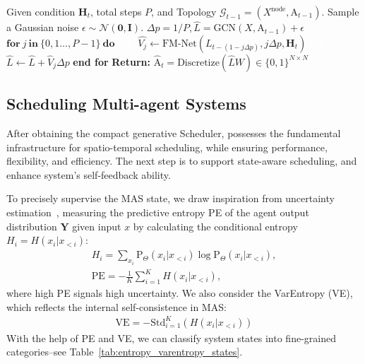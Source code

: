 \begin{algorithm}[H]
\label{alg: flow matching}
\begin{algorithmic}[1]
\State Given condition $\mathbf{H}_t$, total steps $P$,
\Statex and Topology $\mathcal{G}_{t-1}=(X^{\text{node}}, \mathrm{A}_{t-1})$.
\State Sample a Gaussian noise $\epsilon \sim \mathcal{N}(\mathbf{0}, \mathbf{I})$.
\State $\Delta p = 1/P, \hat{L} = \text{GCN}(X, \mathrm{A}_{t-1}) + \epsilon$
\State $\textbf{for}\ j\ \textbf{in}\ \{0, 1 \dots, P-1\}\ \textbf{do}$
\State $\textbf{\textcolor{white}{for}}$\ $\hat{V_j} \leftarrow \text{FM-Net}(L_{t-(1-j\Delta p)},j\Delta p,\mathbf{H}_t)$
\State $\textbf{\textcolor{white}{for}}$\ $\hat{L} \leftarrow \hat{L} + \hat{V}_j\Delta p$
\State \textbf{end for}
\State \textbf{Return:} $\hat{\mathrm{A}}_t =\text{Discretize}(\hat{L} W) \in\{0,1\}^{N\times N}$
\end{algorithmic}
\label{alg}
\end{algorithm}

\subsection{Scheduling Multi-agent Systems}
\label{sec: scheduling}

After obtaining the compact generative Scheduler, \ourmethod possesses the fundamental infrastructure for spatio-temporal scheduling, while ensuring performance, flexibility, and efficiency. The next step is to support state-aware scheduling, and enhance system's self-feedback ability. 

To precisely supervise the MAS state, we draw inspiration from uncertainty estimation~\citep{mackay1992practical}, measuring the predictive entropy PE of the agent output distribution $\mathbf{Y}$ given input $x$ by calculating the conditional entropy $H_i = H(x_i | x_{<i})$:
\begin{gather}
     H_i = \sum_{x_i}\mathrm{P}_\Theta(x_i | x_{<i})\log \mathrm{P}_\Theta(x_i | x_{<i}),\\
    \text{PE} = -\frac{1}{K}\sum_{i=1}^K H(x_i | x_{<i}),
\end{gather}
where high PE signals high uncertainty. We also consider the VarEntropy (VE), which reflects the internal self-consistence in MAS:
\begin{gather}
    \text{VE} = -\text{Std}_{i=1}^K (H(x_i|x_{<i}))
\end{gather}
With the help of PE and VE, we can classify system states into fine-grained categories--see Table~\ref{tab:entropy_varentropy_states}. 

